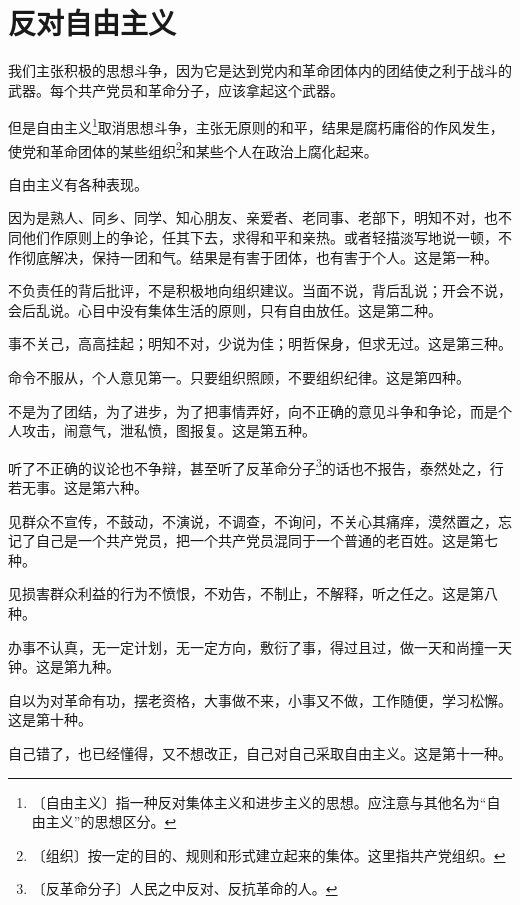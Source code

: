 \documentclass[12pt,UTF-8,openany]{ctexbook}
\begin{document}
\chapter{反对自由主义}

\begin{large}
    
    我们主张积极的思想斗争，因为它是达到党内和革命团体内的团结使之利于战斗的武器。每个共产党员和革命分子，应该拿起这个武器。
    
    但是自由主义\footnote{〔自由主义〕指一种反对集体主义和进步主义的思想。应注意与其他名为“自由主义”的思想区分。}取消思想斗争，主张无原则的和平，结果是腐朽庸俗的作风发生，使党和革命团体的某些组织\footnote{〔组织〕按一定的目的、规则和形式建立起来的集体。这里指共产党组织。}和某些个人在政治上腐化起来。
    
    自由主义有各种表现。
    
    因为是熟人、同乡、同学、知心朋友、亲爱者、老同事、老部下，明知不对，也不同他们作原则上的争论，任其下去，求得和平和亲热。或者轻描淡写地说一顿，不作彻底解决，保持一团和气。结果是有害于团体，也有害于个人。这是第一种。
    
    不负责任的背后批评，不是积极地向组织建议。当面不说，背后乱说；开会不说，会后乱说。心目中没有集体生活的原则，只有自由放任。这是第二种。
    
    事不关己，高高挂起；明知不对，少说为佳；明哲保身，但求无过。这是第三种。
    
    命令不服从，个人意见第一。只要组织照顾，不要组织纪律。这是第四种。
    
    不是为了团结，为了进步，为了把事情弄好，向不正确的意见斗争和争论，而是个人攻击，闹意气，泄私愤，图报复。这是第五种。
    
    听了不正确的议论也不争辩，甚至听了反革命分子\footnote{〔反革命分子〕人民之中反对、反抗革命的人。}的话也不报告，泰然处之，行若无事。这是第六种。
    
    见群众不宣传，不鼓动，不演说，不调查，不询问，不关心其痛痒，漠然置之，忘记了自己是一个共产党员，把一个共产党员混同于一个普通的老百姓。这是第七种。
    
    见损害群众利益的行为不愤恨，不劝告，不制止，不解释，听之任之。这是第八种。
    
    办事不认真，无一定计划，无一定方向，敷衍了事，得过且过，做一天和尚撞一天钟。这是第九种。
    
    自以为对革命有功，摆老资格，大事做不来，小事又不做，工作随便，学习松懈。这是第十种。
    
    自己错了，也已经懂得，又不想改正，自己对自己采取自由主义。这是第十一种。
    

\end{large}
\end{document}
